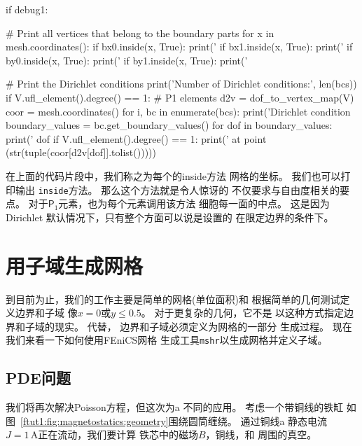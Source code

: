\begin{python}
if debug1:

    # Print all vertices that belong to the boundary parts
    for x in mesh.coordinates():
        if bx0.inside(x, True): print('%
        if bx1.inside(x, True): print('%
        if by0.inside(x, True): print('%
        if by1.inside(x, True): print('%

    # Print the Dirichlet conditions
    print('Number of Dirichlet conditions:', len(bcs))
    if V.ufl_element().degree() == 1:  # P1 elements
        d2v = dof_to_vertex_map(V)
        coor = mesh.coordinates()
        for i, bc in enumerate(bcs):
            print('Dirichlet condition %
            boundary_values = bc.get_boundary_values()
            for dof in boundary_values:
                print('   dof %
                if V.ufl_element().degree() == 1:
                    print('    at point %
                          (str(tuple(coor[d2v[dof]].tolist()))))
\end{python}

\begin{notice}
在上面的代码片段中，我们称之为每个的inside方法
网格的坐标。 我们也可以打印输出
\texttt{inside}方法。 那么这个方法就是令人惊讶的
不仅要求与自由度相关的要点。
对于$\mathsf{P}_1$元素，也为每个元素调用该方法
细胞每一面的中点。 这是因为Dirichlet
默认情况下，只有整个方面可以说是设置的
在限定边界的条件下。
\end{notice}

\section{用子域生成网格}

到目前为止，我们的工作主要是简单的网格(单位面积)和
根据简单的几何测试定义边界和子域
像$x = 0$或$y \leq 0.5$。 对于更复杂的几何，它不是
以这种方式指定边界和子域的现实。 代替，
边界和子域必须定义为网格的一部分
生成过程。 现在我们来看一下如何使用FEniCS网格
生成工具\texttt{mshr}以生成网格并定义子域。

\subsection{PDE问题}


我们将再次解决Poisson方程，但这次为a
不同的应用。 考虑一个带铜线的铁缸
如图~\ref{ftut1:fig:magnetostatics:geometry}围绕圆筒缠绕。 通过铜线a
静态电流$J = 1\,\mathrm{A}$正在流动，我们要计算
铁芯中的磁场$B$，铜线，和
周围的真空。


